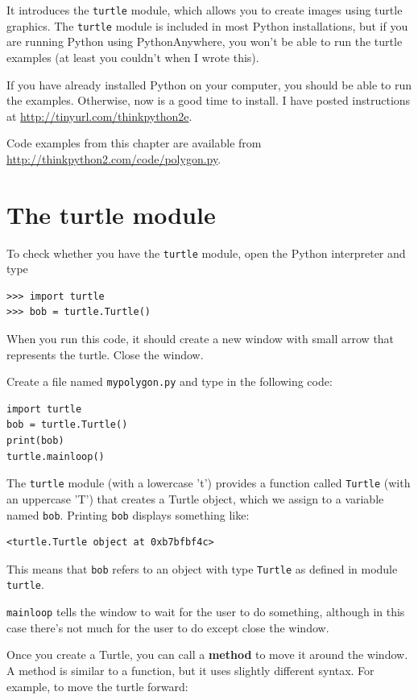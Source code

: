 \documentclass[10pt]{book}
\begin{document}
It introduces the {\tt turtle} module, which allows you to
create images using turtle graphics.  The {\tt turtle} module is
included in most Python installations, but if you are running Python
using PythonAnywhere, you won't be able to run the turtle examples (at
least you couldn't when I wrote this).

If you have already installed Python on your computer, you should
be able to run the examples.  Otherwise, now is a good time
to install.  I have posted instructions at
\url{http://tinyurl.com/thinkpython2e}.

Code examples from this chapter are available from
\url{http://thinkpython2.com/code/polygon.py}.


\section{The turtle module}
\label{turtle}

To check whether you have the {\tt turtle} module, open the Python
interpreter and type

\begin{verbatim}
>>> import turtle
>>> bob = turtle.Turtle()
\end{verbatim}

When you run this code, it should create a new window
with small arrow that represents the turtle.  Close the window.

Create a file named {\tt mypolygon.py} and type in the following
code:

\begin{verbatim}
import turtle
bob = turtle.Turtle()
print(bob)
turtle.mainloop()
\end{verbatim}
%
The {\tt turtle} module (with a lowercase 't') provides a function
called {\tt Turtle} (with an uppercase 'T') that creates a Turtle
object, which we assign to a variable named {\tt bob}.
Printing {\tt bob} displays something like:

\begin{verbatim}
<turtle.Turtle object at 0xb7bfbf4c>
\end{verbatim}
%
This means that {\tt bob} refers to an object with type
{\tt Turtle}
as defined in module {\tt turtle}.

\verb"mainloop" tells the window to wait for the user
to do something, although in this case there's not much for
the user to do except close the window.

Once you create a Turtle, you can call a {\bf method} to move it
around the window.  A method is similar to a function, but it
uses slightly different syntax.  For example, to move the turtle
forward:
\end{document}
